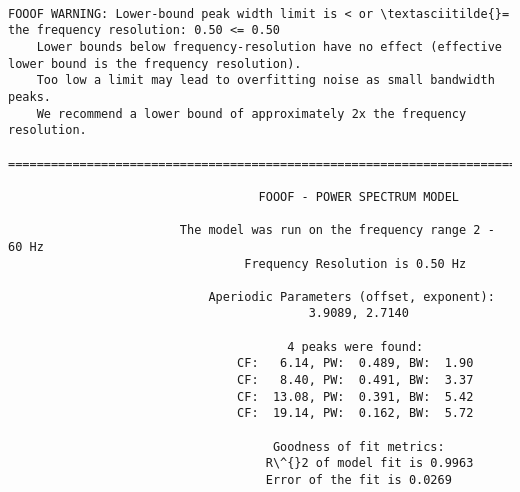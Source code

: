 \documentclass[11pt]{article}
\begin{document}
    \begin{Verbatim}[commandchars=\\\{\}]

FOOOF WARNING: Lower-bound peak width limit is < or \textasciitilde{}= the frequency resolution: 0.50 <= 0.50
	Lower bounds below frequency-resolution have no effect (effective lower bound is the frequency resolution).
	Too low a limit may lead to overfitting noise as small bandwidth peaks.
	We recommend a lower bound of approximately 2x the frequency resolution.

==================================================================================================
                                                                                                  
                                   FOOOF - POWER SPECTRUM MODEL                                   
                                                                                                  
                        The model was run on the frequency range 2 - 60 Hz                        
                                 Frequency Resolution is 0.50 Hz                                  
                                                                                                  
                            Aperiodic Parameters (offset, exponent):                              
                                          3.9089, 2.7140                                          
                                                                                                  
                                       4 peaks were found:                                        
                                CF:   6.14, PW:  0.489, BW:  1.90                                 
                                CF:   8.40, PW:  0.491, BW:  3.37                                 
                                CF:  13.08, PW:  0.391, BW:  5.42                                 
                                CF:  19.14, PW:  0.162, BW:  5.72                                 
                                                                                                  
                                     Goodness of fit metrics:                                     
                                    R\^{}2 of model fit is 0.9963                                    
                                    Error of the fit is 0.0269                                    
                                                                                                  

\end{Verbatim}
\end{document}
